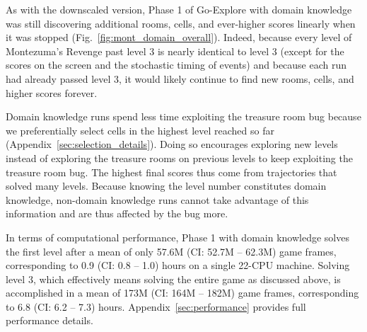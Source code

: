 \documentclass{article}
\newcommand{\pivotci}[2]{(CI: #1 -- #2)}  \newcommand{\percci}[2]{}  \newcommand{\tpivotci}[2]{(#1 -- #2)}  \newcommand{\tpercci}[2]{}  \newcommand{\na}[0]{-}
\begin{document}
As with the downscaled version, Phase 1 of Go-Explore with domain knowledge was still discovering additional rooms, cells, and ever-higher scores linearly when it was stopped (Fig.~\ref{fig:mont_domain_overall}). Indeed, because every level of Montezuma's Revenge past level 3 is nearly identical to level 3 (except for the scores on the screen and the stochastic timing of events) and because each run had already passed level 3, it would likely continue to find new rooms, cells, and higher scores forever.

Domain knowledge runs spend less time exploiting the treasure room bug because we preferentially select cells in the highest level reached so far (Appendix~\ref{sec:selection_details}). Doing so encourages exploring new levels instead of exploring the treasure rooms on previous levels to keep exploiting the treasure room bug. The highest final scores thus come from trajectories that solved many levels. Because knowing the level number constitutes domain knowledge, non-domain knowledge runs cannot take advantage of this information and are thus affected by the bug more.

In terms of computational performance, Phase 1 with domain knowledge solves the first level after a mean of only 57.6M \pivotci{52.7M}{62.3M}\percci{52.8M}{62.5M} game frames, corresponding to 0.9 \pivotci{0.8}{1.0}\percci{0.9}{1.0} hours on a single 22-CPU machine. Solving level 3, which effectively means solving the entire game as discussed above, is accomplished in a mean of 173M \pivotci{164M}{182M}\percci{165M}{182M} game frames, corresponding to 6.8 \pivotci{6.2}{7.3}\percci{6.2}{7.3} hours. Appendix~\ref{sec:performance} provides full performance details.
\end{document}

